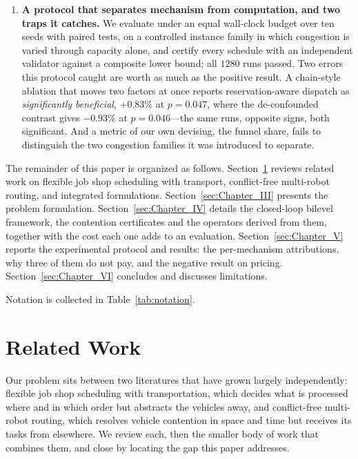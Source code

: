\documentclass[manuscript,screen,review]{acmart}
\begin{document}
\begin{enumerate}[leftmargin=*]
\item \textbf{A protocol that separates mechanism from computation, and two traps
it catches.} We evaluate under an equal wall-clock budget over ten seeds with
paired tests, on a controlled instance family in which congestion is varied
through capacity alone, and certify every schedule with an independent validator
against a composite lower bound; all $1280$ runs passed. Two errors this protocol
caught are worth as much as the positive result. A chain-style ablation that moves
two factors at once reports reservation-aware dispatch as \emph{significantly
beneficial}, $+0.83\%$ at $p=0.047$, where the de-confounded contrast gives
$-0.93\%$ at $p=0.046$---the same runs, opposite signs, both significant. And a
metric of our own devising, the funnel share, fails to distinguish the two
congestion families it was introduced to separate.
\end{enumerate}

The remainder of this paper is organized as follows.
Section~\ref{sec:Chapter_II} reviews related work on flexible job shop
scheduling with transport, conflict-free multi-robot routing, and integrated
formulations. Section~\ref{sec:Chapter_III} presents the problem formulation.
Section~\ref{sec:Chapter_IV} details the closed-loop bilevel framework, the
contention certificates and the operators derived from them, together with the
cost each one adds to an evaluation. Section~\ref{sec:Chapter_V} reports the
experimental protocol and results: the per-mechanism attributions, why three of
them do not pay, and the negative result on pricing.
Section~\ref{sec:Chapter_VI} concludes and discusses limitations.

Notation is collected in Table~\ref{tab:notation}.



\section{Related Work}
\label{sec:Chapter_II}

Our problem sits between two literatures that have grown largely independently:
flexible job shop scheduling with transportation, which decides what is processed
where and in which order but abstracts the vehicles away, and conflict-free
multi-robot routing, which resolves vehicle contention in space and time but
receives its tasks from elsewhere. We review each, then the smaller body of work
that combines them, and close by locating the gap this paper addresses.
\end{document}
